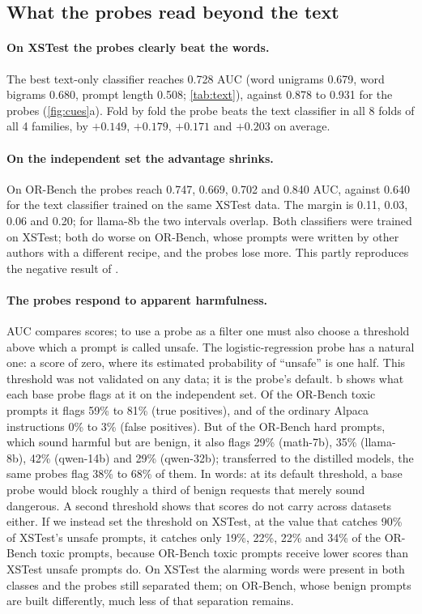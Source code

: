 \documentclass[10pt]{article}
\begin{document}
\subsection{What the probes read beyond the text}
\label{sec:cues}

\paragraph{On XSTest the probes clearly beat the words.} The best text-only classifier reaches 0.728 AUC (word unigrams 0.679, word bigrams 0.680, prompt length 0.508; \cref{tab:text}), against 0.878 to 0.931 for the probes (\cref{fig:cues}a). Fold by fold the probe beats the text classifier in all 8 folds of all 4 families, by $+0.149$, $+0.179$, $+0.171$ and $+0.203$ on average.

\paragraph{On the independent set the advantage shrinks.} On OR-Bench the probes reach 0.747, 0.669, 0.702 and 0.840 AUC, against 0.640 for the text classifier trained on the same XSTest data. The margin is 0.11, 0.03, 0.06 and 0.20; for llama-8b the two intervals overlap. Both classifiers were trained on XSTest; both do worse on OR-Bench, whose prompts were written by other authors with a different recipe, and the probes lose more. This partly reproduces the negative result of \citet{wang2025}.

\paragraph{The probes respond to apparent harmfulness.} AUC compares scores; to use a probe as a filter one must also choose a threshold above which a prompt is called unsafe. The logistic-regression probe has a natural one: a score of zero, where its estimated probability of ``unsafe'' is one half. This threshold was not validated on any data; it is the probe's default. b shows what each base probe flags at it on the independent set. Of the OR-Bench toxic prompts it flags 59\% to 81\% (true positives), and of the ordinary Alpaca instructions 0\% to 3\% (false positives). But of the OR-Bench hard prompts, which sound harmful but are benign, it also flags 29\% (math-7b), 35\% (llama-8b), 42\% (qwen-14b) and 29\% (qwen-32b); transferred to the distilled models, the same probes flag 38\% to 68\% of them. In words: at its default threshold, a base probe would block roughly a third of benign requests that merely sound dangerous. A second threshold shows that scores do not carry across datasets either. If we instead set the threshold on XSTest, at the value that catches 90\% of XSTest's unsafe prompts, it catches only 19\%, 22\%, 22\% and 34\% of the OR-Bench toxic prompts, because OR-Bench toxic prompts receive lower scores than XSTest unsafe prompts do. On XSTest the alarming words were present in both classes and the probes still separated them; on OR-Bench, whose benign prompts are built differently, much less of that separation remains.
\end{document}
